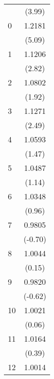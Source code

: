 {\begin{tabular}{l*{1}{c}}
                                   &      (3.99)         \\
[1em]
    0                              &      1.2181\sym{***}\\
                                   &      (5.09)         \\
[1em]
    1                              &      1.1206\sym{***}\\
                                   &      (2.82)         \\
[1em]
    2                              &      1.0802\sym{*}  \\
                                   &      (1.92)         \\
[1em]
    3                              &      1.1271\sym{**} \\
                                   &      (2.49)         \\
[1em]
    4                              &      1.0593         \\
                                   &      (1.47)         \\
[1em]
    5                              &      1.0487         \\
                                   &      (1.14)         \\
[1em]
    6                              &      1.0348         \\
                                   &      (0.96)         \\
[1em]
    7                              &      0.9805         \\
                                   &     (-0.70)         \\
[1em]
    8                              &      1.0044         \\
                                   &      (0.15)         \\
[1em]
    9                              &      0.9820         \\
                                   &     (-0.62)         \\
[1em]
   10                              &      1.0021         \\
                                   &      (0.06)         \\
[1em]
   11                              &      1.0164         \\
                                   &      (0.39)         \\
[1em]
   12                              &      1.0014         \\

\end{tabular}}
